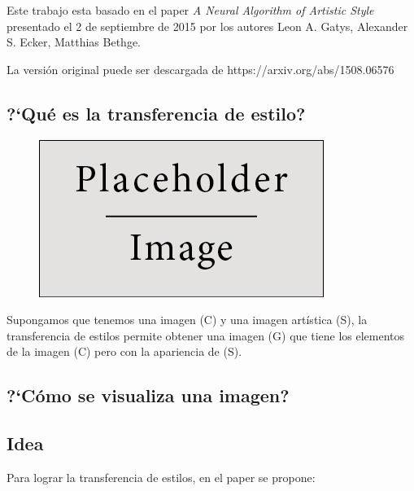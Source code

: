 \documentclass[
paper=128mm:96mm, %
fontsize=11pt, %
pagesize, %
parskip=half-, %
]{scrartcl} %
\newcommand*{\mygreen}[1]{\textcolor{mygreen}{#1}}
\newcommand*{\myblue}[1]{\textcolor{myblue}{#1}}
\theoremstyle{mythmstyle} %
\begin{document}
Este trabajo esta basado en el paper \textit{A Neural Algorithm of Artistic Style} presentado el 2 de septiembre de 2015 por los autores Leon A. Gatys, Alexander S. Ecker, Matthias Bethge.

La versi\'on original puede ser descargada de \myblue{https://arxiv.org/abs/1508.06576}

\clearpage


\subsection{?`Qu\'e es la transferencia de estilo?}

\begin{figure}[h]
\centering\includegraphics[width=0.4\linewidth]{imagenes/placeholder}
\end{figure}

Supongamos que tenemos una imagen \mygreen{(C)} y una imagen art\'istica \mygreen{(S)}, la transferencia de estilos permite obtener una imagen \mygreen{(G)} que tiene los elementos de la imagen \mygreen{(C)} pero con la apariencia de \mygreen{(S)}.


\clearpage



\subsection{?`C\'omo se visualiza una imagen?}

\clearpage





\subsection{Idea}
Para lograr la transferencia de estilos, en el paper se propone:
\end{document}
